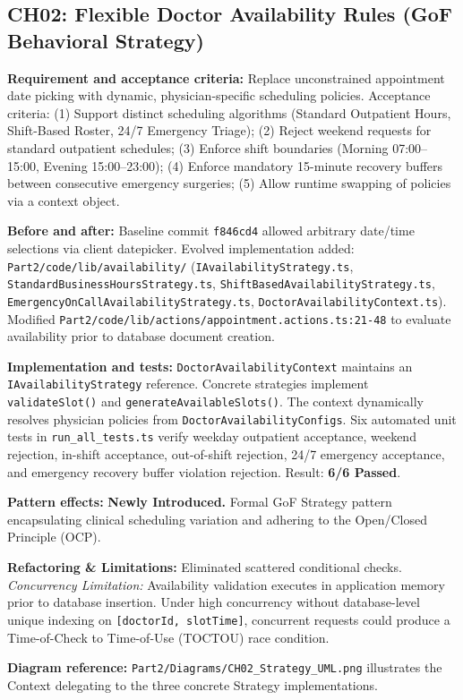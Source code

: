 \documentclass[11pt,a4paper]{article}
\newcommand{\entry}[2]{\textbf{#1:} #2\par}
\begin{document}
\subsection{CH02: Flexible Doctor Availability Rules (GoF Behavioral Strategy)}
\entry{Requirement and acceptance criteria}{Replace unconstrained appointment date picking with dynamic, physician-specific scheduling policies. Acceptance criteria: (1) Support distinct scheduling algorithms (Standard Outpatient Hours, Shift-Based Roster, 24/7 Emergency Triage); (2) Reject weekend requests for standard outpatient schedules; (3) Enforce shift boundaries (Morning 07:00--15:00, Evening 15:00--23:00); (4) Enforce mandatory 15-minute recovery buffers between consecutive emergency surgeries; (5) Allow runtime swapping of policies via a context object.}
\entry{Before and after}{Baseline commit \texttt{f846cd4} allowed arbitrary date/time selections via client datepicker. Evolved implementation added: \texttt{Part2/code/lib/availability/} (\texttt{IAvailabilityStrategy.ts}, \texttt{StandardBusinessHoursStrategy.ts}, \texttt{ShiftBasedAvailabilityStrategy.ts}, \texttt{EmergencyOnCallAvailabilityStrategy.ts}, \texttt{DoctorAvailabilityContext.ts}). Modified \texttt{Part2/code/lib/actions/appointment.actions.ts:21-48} to evaluate availability prior to database document creation.}
\entry{Implementation and tests}{\texttt{DoctorAvailabilityContext} maintains an \texttt{IAvailabilityStrategy} reference. Concrete strategies implement \texttt{validateSlot()} and \texttt{generateAvailableSlots()}. The context dynamically resolves physician policies from \texttt{DoctorAvailabilityConfigs}. Six automated unit tests in \texttt{run\_all\_tests.ts} verify weekday outpatient acceptance, weekend rejection, in-shift acceptance, out-of-shift rejection, 24/7 emergency acceptance, and emergency recovery buffer violation rejection. Result: \textbf{6/6 Passed}.}
\entry{Pattern effects}{\textbf{Newly Introduced.} Formal GoF Strategy pattern encapsulating clinical scheduling variation and adhering to the Open/Closed Principle (OCP).}
\entry{Refactoring \& Limitations}{Eliminated scattered conditional checks. \textit{Concurrency Limitation:} Availability validation executes in application memory prior to database insertion. Under high concurrency without database-level unique indexing on \texttt{[doctorId, slotTime]}, concurrent requests could produce a Time-of-Check to Time-of-Use (TOCTOU) race condition.}
\entry{Diagram reference}{\texttt{Part2/Diagrams/CH02\_Strategy\_UML.png} illustrates the Context delegating to the three concrete Strategy implementations.}
\end{document}
